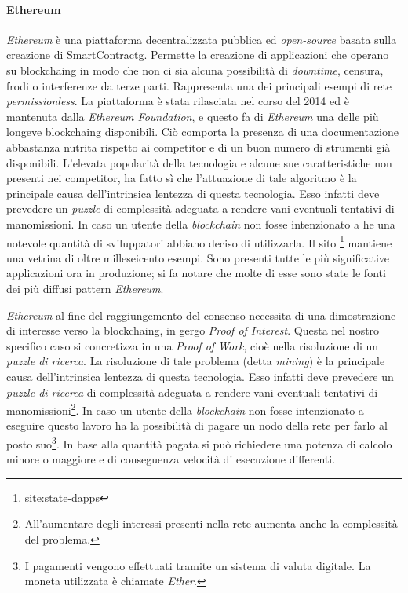 \paragraph{Ethereum}
\label{cap:ETH}
\emph{Ethereum} è una piattaforma decentralizzata pubblica ed \emph{open-source} basata sulla creazione di \gls{SmartContractg}. Permette la creazione di applicazioni che operano su \gls{blockchaing} in modo che non ci sia alcuna possibilità di \emph{downtime}, censura, frodi o interferenze da terze parti. Rappresenta una dei principali esempi di rete \emph{permissionless}.
La piattaforma è stata rilasciata nel corso del 2014 ed è mantenuta dalla \emph{Ethereum Foundation}, e questo fa di \emph{Ethereum} una delle più longeve \gls{blockchaing} disponibili. Ciò comporta la presenza di una documentazione abbastanza nutrita rispetto ai competitor e di un buon numero di strumenti già disponibili. 
L’elevata popolarità della tecnologia e alcune sue caratteristiche non presenti nei competitor, ha fatto sì che l'attuazione di tale algoritmo è la principale causa dell'intrinsica lentezza di questa tecnologia. Esso infatti deve prevedere un \emph{puzzle} di complessità adeguata a rendere vani eventuali tentativi di manomissioni. In caso un utente della \emph{blockchain} non fosse intenzionato a he una notevole quantità di sviluppatori abbiano deciso di utilizzarla. Il sito \footnote{site:state-dapps} mantiene una vetrina di oltre milleseicento esempi. Sono presenti tutte le più significative applicazioni ora in produzione; si fa notare che molte di esse sono state le fonti dei più diffusi pattern \emph{Ethereum}.

\medskip
\emph{Ethereum} al fine del raggiungemento del consenso necessita di una dimostrazione di interesse verso la \gls{blockchaing}, in gergo \emph{Proof of Interest}. Questa nel nostro specifico caso si concretizza in una  \emph{Proof of Work}, cioè nella risoluzione di un \emph{puzzle di ricerca}. 
La risoluzione di tale problema (detta \emph{mining}) è la principale causa dell'intrinsica lentezza di questa tecnologia. Esso infatti deve prevedere un \emph{puzzle di ricerca} di complessità adeguata a rendere vani eventuali tentativi di manomissioni\footnote{All'aumentare degli interessi presenti nella rete aumenta anche la complessità del problema.}. 
In caso un utente della \emph{blockchain} non fosse intenzionato a eseguire questo lavoro ha la possibilità di pagare un nodo della rete per farlo al posto suo\footnote{I pagamenti vengono effettuati tramite un sistema di valuta digitale. La moneta utilizzata è chiamate \emph{Ether}.}. In base alla quantità pagata si può richiedere una potenza di calcolo minore o maggiore e di conseguenza velocità di esecuzione differenti.

